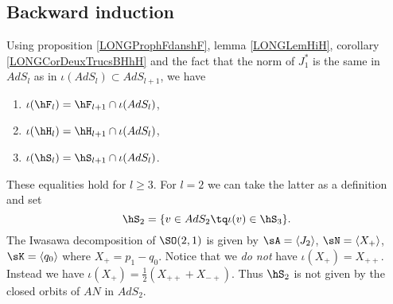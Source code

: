 %
\subsection{Backward induction}
%

Using proposition \ref{LONGProphFdanshF}, lemma \ref{LONGLemHiH}, corollary \ref{LONGCorDeuxTrucsBHhH} and the fact that the norm of $J_1^*$ is the same in $AdS_l$ as in $\iota(AdS_l)\subset AdS_{l+1}$, we have
\begin{enumerate}
	\item
		$\iota(\hF_l)=\hF_{l+1}\cap\iota(AdS_l)$,
	\item
		$\iota(\hH_l)=\hH_{l+1}\cap\iota(AdS_l)$,
	\item 
		$\iota(\hS_l)=\hS_{l+1}\cap\iota(AdS_l)$.
\end{enumerate}
These equalities hold for $l\geq 3$. For $l=2$ we can take the latter as a definition and set
\begin{equation}
	\hS_2=\{ v\in AdS_2\tq \iota(v)\in\hS_3 \}.
\end{equation}
The Iwasawa decomposition of $\SO(2,1)$ is given by $\sA=\langle J_2\rangle$, $\sN=\langle X_+\rangle$, $\sK=\langle q_0\rangle$ where $X_+=p_1-q_0$. Notice that we \emph{do not} have $\iota(X_+)=X_{++}$. Instead we have $\iota(X_+)=\frac{ 1 }{2}(X_{++}+X_{-+})$. Thus $\hS_2$ is not given by the closed orbits of $AN$ in $AdS_2$.

